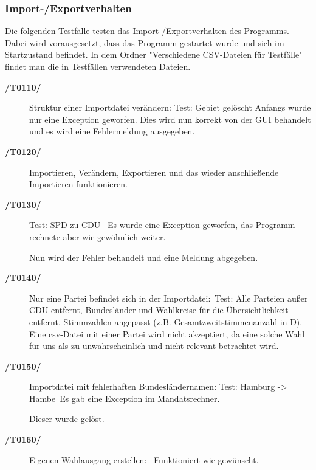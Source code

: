 \documentclass[12pt,a4paper,titlepage]{article}
\begin{document}
\subsubsection{Import-/Exportverhalten}
Die folgenden Testfälle testen das Import-/Exportverhalten des Programms. Dabei wird vorausgesetzt, dass das Programm gestartet wurde und sich im Startzustand befindet. In dem Ordner "Verschiedene CSV-Dateien für Testfälle" findet man die in Testfällen verwendeten Dateien.
\begin{description}
	\item[\textbf{/T0110/}] Struktur einer Importdatei verändern: \newline
	Test: Gebiet gelöscht \newline
	Anfangs wurde nur eine Exception geworfen. Dies wird nun korrekt von der GUI behandelt und es wird eine Fehlermeldung ausgegeben.
	\item[\textbf{/T0120/}] 
	Importieren, Verändern, Exportieren und das wieder anschließende Importieren funktionieren.\\ 
	\item[\textbf{/T0130/}] 
	Test: SPD zu CDU \
	Es wurde eine Exception geworfen, das Programm rechnete aber wie gewöhnlich weiter.
	
	Nun wird der Fehler behandelt und eine Meldung abgegeben.
	
	\item[\textbf{/T0140/}] Nur eine Partei befindet sich in der Importdatei:\
	Test: Alle Parteien außer CDU entfernt, Bundesländer und Wahlkreise für die Übersichtlichkeit entfernt, Stimmzahlen angepasst (z.B. Gesamtzweitstimmenanzahl in D). \\

Eine csv-Datei mit einer Partei wird nicht akzeptiert, da eine solche Wahl für uns als zu unwahrscheinlich und nicht relevant betrachtet wird.
	\item[\textbf{/T0150/}] Importdatei mit fehlerhaften Bundesländernamen:
	Test: Hamburg -> Hambe\
Es gab eine Exception im Mandatsrechner.

Dieser wurde gelöst.
	\item[\textbf{/T0160/}] Eigenen Wahlausgang erstellen: \
	Funktioniert wie gewünscht.
\end{description}
\end{document}
